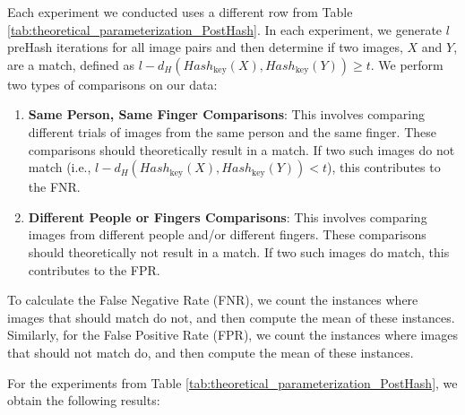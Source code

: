 Each experiment we conducted uses a different row from Table \ref{tab:theoretical_parameterization_PostHash}. In each experiment, we generate \( l \) preHash iterations for all image pairs and then determine if two images, \(X\) and \(Y\), are a match, defined as \( l - d_H(Hash_{\text{key}}(X), Hash_{\text{key}}(Y)) \geq t \). We perform two types of comparisons on our data:


\begin{enumerate}
    \item \textbf{Same Person, Same Finger Comparisons}: This involves comparing different trials of images from the same person and the same finger. These comparisons should theoretically result in a match. If two such images do not match (i.e., \( l - d_H(Hash_{\text{key}}(X), Hash_{\text{key}}(Y)) < t \)), this contributes to the FNR.
    \item \textbf{Different People or Fingers Comparisons}: This involves comparing images from different people and/or different fingers. These comparisons should theoretically not result in a match. If two such images do match, this contributes to the FPR.
\end{enumerate}

To calculate the False Negative Rate (FNR), we count the instances where images that should match do not, and then compute the mean of these instances. Similarly, for the False Positive Rate (FPR), we count the instances where images that should not match do, and then compute the mean of these instances.

For the experiments from Table \ref{tab:theoretical_parameterization_PostHash}, we obtain the following results:

